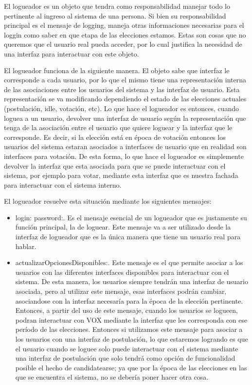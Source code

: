El logueador es un objeto que tendra como responsabilidad manejar todo lo pertinente al ingreso al sistema de una persona. Si bien su responsabilidad principal es el mensaje de logging, maneja otras informaciones necesarias para el loggin como saber en que etapa de las elecciones estamos. Estas son cosas que no queremos que el usuario real pueda acceder, por lo cual justifica la necesidad de una interfaz para interactuar con este objeto.

El logueador funciona de la siguiente manera. El objeto sabe que interfaz le corresponde a cada usuario, por lo que el mismo tiene una representaci\'on interna de las asociaciones entre los usuarios del sistema y las interfaz de usuario. Esta representaci\'on se va modificando dependiendo el estado de las elecciones actuales (postulaci\'on, idle, votaci\'on, etc).
Lo que hace el logueador es entonces, cuando loguea a un usuario, devolver una interfaz de usuario seg\'un la representaci\'on que tenga de la asociaci\'on entre el usuario que quiere loguear y la interfaz que le corresponde. Es decir, si la elecci\'on est\'a en \'epoca de votaci\'on entonces los usuarios del sistema estaran asociados a interfaces de usuario que en realidad son interfaces para votaci\'on. De esta forma, lo que hace el logueador es simplemente devolver la interfaz que esta asociada para que se puede interactuar con el sistema, por ejemplo para votar, mediante esta interfaz que es nuestra fachada para interactuar con el sistema interno.

El logueador resuelve esta situaci\'on mediante los siguientes mensajes:

\begin{itemize}
\item login: password:. Es el mensaje esencial de un logueador que es justamente su funci\'on principal, la de loguear. Este mensaje va a ser utilizado desde la interfaz de logueador que es la \'unica manera que tiene un usuario real para hablar.
\item actualizarOpcionesDisponibles:. Este mensaje es el que permite asociar a los usuarios con las diferentes interfaces disponibles para interactuar con el sistema. De esta manera, los usuarios siempre tendr\'an una interfaz de usuario asociada, pero al utilizar este mensaje, esas interfaces podr\'an cambiar, asociandose con la interfaz necesar\'ia para la \'epoca de la elecci\'on pertinente. Entonces, a partir del uso de este mensaje, cuando los usuarios se logueen, podran interactuar con VOX mediante la interfaz que les corresponda con ese per\'iodo de las elecciones. Entonces si utilizamos este mensaje para asociar a los usuarios con una interfaz de postulaci\'on, lo que estaremos logrando es que el usuario cuando se loguee solo puede interactuar con el sistema mediante una interfaz de postulaci\'on que solo tendr\'a como opci\'on de funcionalidad posible el hecho de candidatearse; ya que por la \'epoca de las elecciones en las que se encuentra el sistema, no se deber\'ia poner hacer otra cosa.
\end{itemize}

